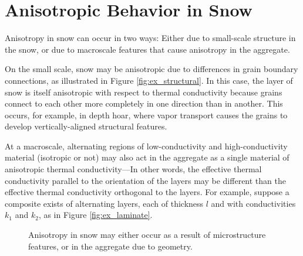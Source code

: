 \section{Anisotropic Behavior in Snow}

Anisotropy in snow can occur in two ways: Either due to small-scale structure
in the snow, or due to macroscale features that cause anisotropy in the
aggregate.

On the small scale, snow may be anisotropic due to differences in grain boundary
connections, as illustrated in Figure \ref{fig:ex_structural}. \cite{pitman} In this case, the
layer of snow is itself anisotropic with respect to thermal conductivity because
grains connect to each other more completely in one direction than in another.
This occurs, for example, in depth hoar, where vapor transport causes the grains
to develop vertically-aligned structural features.

At a macroscale, alternating regions of low-conductivity and high-conductivity
material (isotropic or not) may also act in the aggregate as a single material of anisotropic thermal
conductivity---In other words, the effective thermal conductivity parallel to
the orientation of the layers may be different than the effective thermal
conductivity orthogonal to the layers. For example, suppose a composite exists of alternating layers, each of thickness
\(l\) and with conductivities \(k_1\) and \(k_2\), as in Figure
\ref{fig:ex_laminate}.

\begin{figure}[h]
\centering
{}
\hspace{0.5in}
\caption{Anisotropy in snow may either occur as a result of microstructure features, or
in the aggregate due to geometry. }
\end{figure}

